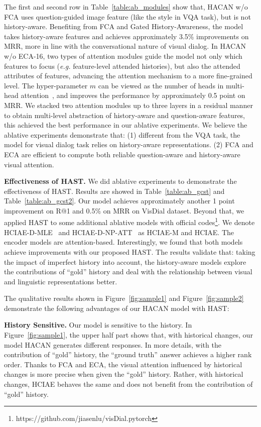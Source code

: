 \documentclass[10pt,twocolumn,letterpaper]{article}
\begin{document}
The first and second row in Table~\ref{table:ab_modules} show that, HACAN w/o FCA uses question-guided image feature (like the style in VQA task), but is not history-aware. Benefiting from FCA and Gated History-Awareness, the model takes history-aware features and achieves approximately 3.5\% improvements on MRR, more in line with the conversational nature of visual dialog. In HACAN w/o ECA-16, two types of attention modules guide the model not only which features to focus (\emph{e.g.} feature-level attended histories), but also the attended attributes of features, advancing the attention mechanism to a more fine-grained level. The hyper-parameter $m$ can be viewed as the number of heads in multi-head attention~\cite{vaswani2017attention}, and improves the performance by approximately 0.5 point on MRR. We stacked two attention modules up to three layers in a residual manner to obtain multi-level abstraction of history-aware and question-aware features, this achieved the best performance in our ablative experiments. We believe the ablative experiments demonstrate that: (1) different from the VQA task, the model for visual dialog task relies on history-aware representations. (2) FCA and ECA are efficient to compute both reliable question-aware and history-aware visual attention.

\noindent \textbf{Effectiveness of HAST.} We did ablative experiments to demonstrate the effectiveness of HAST. Results are showed in Table~\ref{table:ab_gcst} and Table~\ref{table:ab_gcst2}. Our model achieves approximately another 1 point improvement on R@1 and 0.5\% on MRR on VisDial dataset. Beyond that, we applied HAST to some additional ablative models with official codes\footnote{https://github.com/jiasenlu/visDial.pytorch}. We denote HCIAE-D-MLE~\cite{lu2017best} and HCIAE-D-NP-ATT~\cite{lu2017best} as HCIAE-M and HCIAE. The encoder models are attention-based. Interestingly, we found that both models achieve improvements with our proposed HAST. The results validate that: taking the impact of imperfect history into account, the history-aware models explore the contributions of ``gold'' history and deal with the relationship between visual and linguistic representations better.

The qualitative results shown in Figure~\ref{fig:sample1} and Figure~\ref{fig:sample2} demonstrate the following advantages of our HACAN model with HAST: 

\noindent \textbf{History Sensitive.} Our model is sensitive to the history. In Figure~\ref{fig:sample1}, the upper half part shows that, with historical changes, our model HACAN generates different responses. In more details, with the contribution of ``gold'' history, the ``ground truth'' answer achieves a higher rank order. Thanks to FCA and ECA, the visual attention influenced by historical changes is more precise when given the ``gold'' history. Rather, with historical changes, HCIAE behaves the same and does not benefit from the contribution of ``gold'' history.
\end{document}
